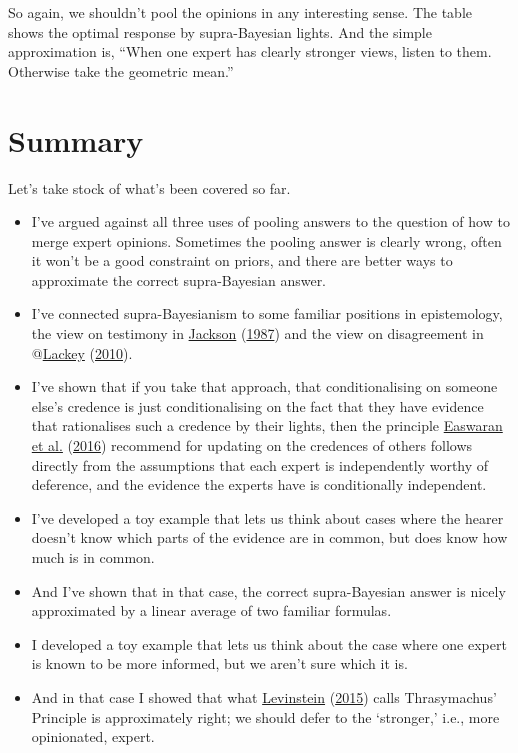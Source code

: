 \documentclass[
  12pt,
]{article}
\providecommand{\tightlist}{%
  \setlength{\itemsep}{0pt}\setlength{\parskip}{0pt}}
\begin{document}
So again, we shouldn't pool the opinions in any interesting sense. The
table shows the optimal response by supra-Bayesian lights. And the
simple approximation is, ``When one expert has clearly stronger views,
listen to them. Otherwise take the geometric mean.''

\hypertarget{summary}{%
\section{Summary}\label{summary}}

Let's take stock of what's been covered so far.

\begin{itemize}
\tightlist
\item
  I've argued against all three uses of pooling answers to the question
  of how to merge expert opinions. Sometimes the pooling answer is
  clearly wrong, often it won't be a good constraint on priors, and
  there are better ways to approximate the correct supra-Bayesian
  answer.
\item
  I've connected supra-Bayesianism to some familiar positions in
  epistemology, the view on testimony in
  \protect\hyperlink{ref-Jackson1987}{Jackson}
  (\protect\hyperlink{ref-Jackson1987}{1987}) and the view on
  disagreement in @\protect\hyperlink{ref-Lackey2010-LACWSW}{Lackey}
  (\protect\hyperlink{ref-Lackey2010-LACWSW}{2010}).
\item
  I've shown that if you take that approach, that conditionalising on
  someone else's credence is just conditionalising on the fact that they
  have evidence that rationalises such a credence by their lights, then
  the principle \protect\hyperlink{ref-EaswaranEtAl2016}{Easwaran et
  al.} (\protect\hyperlink{ref-EaswaranEtAl2016}{2016}) recommend for
  updating on the credences of others follows directly from the
  assumptions that each expert is independently worthy of deference, and
  the evidence the experts have is conditionally independent.
\item
  I've developed a toy example that lets us think about cases where the
  hearer doesn't know which parts of the evidence are in common, but
  does know how much is in common.
\item
  And I've shown that in that case, the correct supra-Bayesian answer is
  nicely approximated by a linear average of two familiar formulas.
\item
  I developed a toy example that lets us think about the case where one
  expert is known to be more informed, but we aren't sure which it is.
\item
  And in that case I showed that what
  \protect\hyperlink{ref-Levinstein2015}{Levinstein}
  (\protect\hyperlink{ref-Levinstein2015}{2015}) calls Thrasymachus'
  Principle is approximately right; we should defer to the `stronger,'
  i.e., more opinionated, expert.
\end{itemize}
\end{document}
